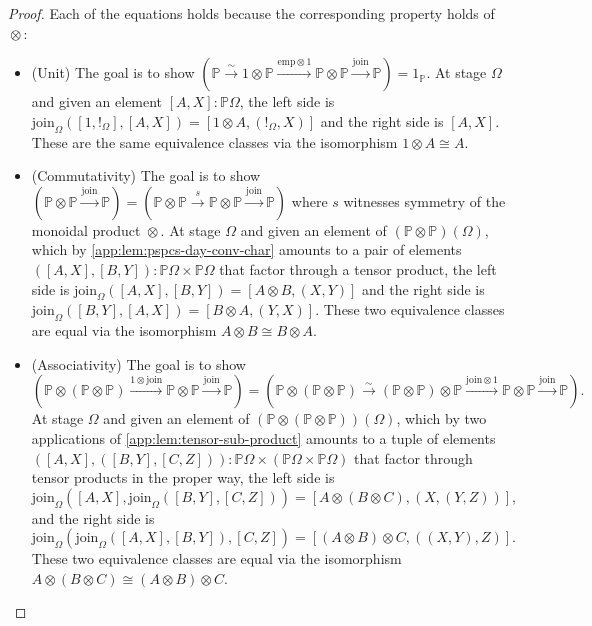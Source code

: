 \documentclass[
  sigconf,
  screen, ]{acmart}
\theoremstyle{definition}
\newcommand\nref[2]{\hyperref[#1]{#2}} \newcommand\checkhigh{{\huge{\color{red}\textbf{TODO: check}}}}
\newcommand\shotimes{\mathop{\otimes}}
\newcommand\pcmjoin{{\nref{app:def:pspcs-tensor-join}{\mathrm{join}}}}
\newcommand\pcmunit{{\nref{app:def:pspcs-join-unit}{\mathrm{emp}}}}
\newcommand\texpspcs{\mathbb P}
\newcommand\pspcs{{\nref{def:mble-pspcs}{\texpspcs}}}
\begin{document}
\begin{proof}
  Each of the equations holds because
  the corresponding property holds of $\shotimes$:
  \begin{itemize}
    \item (Unit)
      The goal is to show
      $\left(\pspcs \xrightarrow{\sim} 1\shotimes\pspcs \xrightarrow{\pcmunit\otimes 1} \pspcs\shotimes\pspcs
      \xrightarrow{\pcmjoin} \pspcs\right)
      = 1_\pspcs$.
      At stage $\Omega$ and given an element $[A,X]:\pspcs\Omega$, 
      the left side is
      $\pcmjoin_\Omega([1,!_\Omega], [A,X]) = [1\otimes A, (!_\Omega,X)]$
      and the right side is $[A, X]$.
      These are the same equivalence classes via the isomorphism $1\otimes A\cong A$.
    \item (Commutativity)
      The goal is to show
      $\left(\pspcs\shotimes\pspcs \xrightarrow{\pcmjoin} \pspcs \right)
      =\left(\pspcs\shotimes\pspcs \xrightarrow{s} \pspcs\shotimes\pspcs \xrightarrow{\pcmjoin} \pspcs \right)$
      where $s$ witnesses symmetry of the monoidal product $\shotimes$.
      At stage $\Omega$ and given an element of $(\pspcs\shotimes\pspcs)(\Omega)$,
      which by  \cref{app:lem:pspcs-day-conv-char} amounts to 
      a pair of elements $([A,X],[B,Y]):\pspcs\Omega\times\pspcs\Omega$
      that factor through a tensor product,
      the left side is
      $\pcmjoin_\Omega([A,X], [B,Y]) = [A\otimes B, (X,Y)]$
      and the right side is
      $\pcmjoin_\Omega([B,Y], [A,X]) = [B\otimes A, (Y,X)]$.
      These two equivalence classes are equal
      via the isomorphism $A\otimes B\cong B\otimes A$.
    \item (Associativity)
      The goal is to show
      \[\left(\pspcs\shotimes(\pspcs\shotimes\pspcs) \xrightarrow{1\otimes \pcmjoin}
        \pspcs\shotimes\pspcs \xrightarrow\pcmjoin \pspcs \right)
      =\left(\pspcs\shotimes(\pspcs\shotimes\pspcs) \xrightarrow{\sim}
      (\pspcs\shotimes\pspcs)\shotimes\pspcs\xrightarrow{\pcmjoin\otimes 1}
      \pspcs\shotimes\pspcs \xrightarrow{\pcmjoin} \pspcs \right).\]
      At stage $\Omega$ and given an element of $(\pspcs\shotimes(\pspcs\shotimes\pspcs))(\Omega)$,
      which by two applications of \cref{app:lem:tensor-sub-product} amounts to 
      a tuple of elements $([A,X],([B,Y],[C,Z])):\pspcs\Omega\times(\pspcs\Omega\times\pspcs\Omega)$
      that factor through tensor products in the proper way,
      the left side is
      \[\pcmjoin_\Omega([A,X], \pcmjoin_\Omega([B,Y], [C,Z]))=[A\otimes (B\otimes C), (X,(Y,Z))],\]
      and the right side is
      \[\pcmjoin_\Omega(\pcmjoin_\Omega([A,X],[B,Y]),[C,Z])=[(A\otimes B)\otimes C, ((X,Y),Z)].\]
      These two equivalence classes are equal
      via the isomorphism $A\otimes (B\otimes C)\cong (A\otimes B)\otimes C$.
  \end{itemize}
\end{proof}
\end{document}
